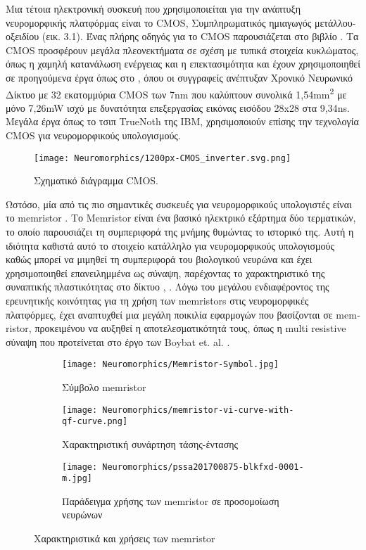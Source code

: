 \documentclass[12pt]{report}
\begin{document}
Μια τέτοια ηλεκτρονική συσκευή που χρησιμοποιείται για την ανάπτυξη νευρομορφικής πλατφόρμας είναι το \textlatin{CMOS}, Συμπληρωματικός ημιαγωγός μετάλλου-οξειδίου (εικ. 3.1). Ένας πλήρης οδηγός για το \textlatin{CMOS} παρουσιάζεται στο βιβλίο \cite{Baker2005}. Τα \textlatin{CMOS} προσφέρουν μεγάλα πλεονεκτήματα σε σχέση με τυπικά στοιχεία κυκλώματος, όπως η χαμηλή κατανάλωση ενέργειας και η επεκτασιμότητα και έχουν χρησιμοποιηθεί σε προηγούμενα έργα όπως στο \cite{Nair2020}, όπου οι συγγραφείς ανέπτυξαν Χρονικό Νευρωνικό Δίκτυο με 32 εκατομμύρια \textlatin{CMOS} των 7\textlatin{nm} που καλύπτουν συνολικά 1,54\textlatin{mm}\textsuperscript{2} με μόνο 7,26\textlatin{mW} ισχύ με δυνατότητα επεξεργασίας εικόνας εισόδου 28\textlatin{x}28 στα 9,34\textlatin{ns}. Μεγάλα έργα όπως το τσιπ \textlatin{TrueNoth} της \textlatin{IBM}, χρησιμοποιούν επίσης την τεχνολογία \textlatin{CMOS} για νευρομορφικούς υπολογισμούς.

\begin{figure}[htp]
    \centering
    \texttt{[image: Neuromorphics/1200px-CMOS\_inverter.svg.png]}
    \caption{Σχηματικό διάγραμμα CMOS.}
    \label{fig:truenorth}
\end{figure}

Ωστόσο, μία από τις πιο σημαντικές συσκευές για νευρομορφικούς υπολογιστές είναι το memristor \cite{Chua1971}. Το \textlatin{Memristor} είναι ένα βασικό ηλεκτρικό εξάρτημα δύο τερματικών, το οποίο παρουσιάζει τη συμπεριφορά της μνήμης θυμώντας το ιστορικό της. Αυτή η ιδιότητα καθιστά αυτό το στοιχείο κατάλληλο για νευρομορφικούς υπολογισμούς καθώς μπορεί να μιμηθεί τη συμπεριφορά του βιολογικού νευρώνα και έχει χρησιμοποιηθεί επανειλημμένα ως σύναψη, παρέχοντας το χαρακτηριστικό της συναπτικής πλαστικότητας στο δίκτυο \cite{Wang2012}, \cite{Jo2010}. Λόγω του μεγάλου ενδιαφέροντος της ερευνητικής κοινότητας για τη χρήση των memristors στις νευρομορφικές πλατφόρμες, έχει αναπτυχθεί μια μεγάλη ποικιλία εφαρμογών που βασίζονται σε \textlatin{memristor}, προκειμένου να αυξηθεί η αποτελεσματικότητά τους, όπως η \textlatin{multi resistive} σύναψη που προτείνεται στο έργο των Boybat \textlatin{et}. \textlatin{al}. \cite{Boybat2018}.

\begin{figure}
\centering
\begin{subfigure}{.5\textwidth}
  \centering
  \texttt{[image: Neuromorphics/Memristor-Symbol.jpg]}
  \caption{Σύμβολο \textlatin{memristor}}
  \label{fig:sub1}
\end{subfigure}%
\begin{subfigure}{.7\textwidth}
  \centering
  \texttt{[image: Neuromorphics/memristor-vi-curve-with-qf-curve.png]}
  \caption{Χαρακτηριστική συνάρτηση τάσης-έντασης}
  \label{fig:sub2}
\end{subfigure}
\begin{subfigure}{.8\textwidth}
  \centering
  \texttt{[image: Neuromorphics/pssa201700875-blkfxd-0001-m.jpg]}
  \caption{Παράδειγμα χρήσης των \textlatin{memristor} σε προσομοίωση νευρώνων}
  \label{fig:sub2}
\end{subfigure}
\caption{Χαρακτηριστικά και χρήσεις των \textlatin{memristor} }
\label{fig:test}
\end{figure}
\end{document}
